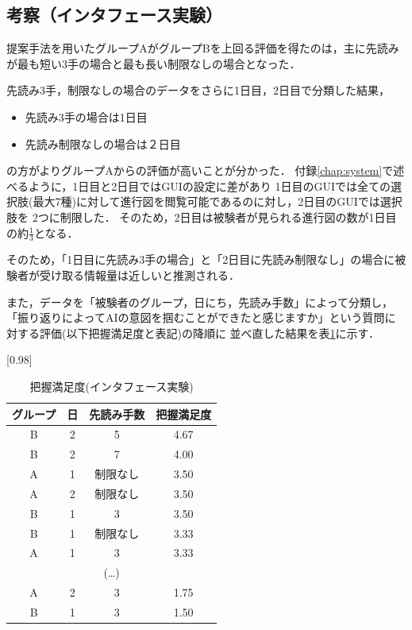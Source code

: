 \subsection{考察（インタフェース実験）}


提案手法を用いたグループAがグループBを上回る評価を得たのは，主に先読みが最も短い3手の場合と最も長い制限なしの場合となった．

先読み3手，制限なしの場合のデータをさらに1日目，2日目で分類した結果，
\begin{itemize}
    \item 先読み3手の場合は1日目
    \item 先読み制限なしの場合は２日目
\end{itemize}

の方がよりグループAからの評価が高いことが分かった．
付録\ref{chap:system}で述べるように，1日目と2日目ではGUIの設定に差があり
1日目のGUIでは全ての選択肢(最大7種)に対して進行図を閲覧可能であるのに対し，2日目のGUIでは選択肢を
2つに制限した．
そのため，2日目は被験者が見られる進行図の数が1日目の約$\frac{1}{3}$となる．

そのため，「1日目に先読み3手の場合」と「2日目に先読み制限なし」の場合に被験者が受け取る情報量は近しいと推測される．

また，データを「被験者のグループ，日にち，先読み手数」によって分類し，「振り返りによってAIの意図を掴むことができたと感じますか」という質問に対する評価(以下把握満足度と表記)の降順に
並べ直した結果を表\ref{table:order}に示す．
\begin{table}[H]
	\caption{把握満足度(インタフェース実験)}
    \label{table:order}
    \scriptsize
	\centering
	\scalebox{0.98}[0.98]{
		\begin{tabular}{c|c|c||c}
			グループ& 日 & 先読み手数 &把握満足度 \\ \hline
			B & 2 & 5 & 4.67\\
            B & 2 & 7 & 4.00\\
            A & 1 & 制限なし& 3.50\\
            A & 2 & 制限なし& 3.50\\
            B & 1 & 3& 3.50\\
            B & 1 & 制限なし& 3.33\\
            A & 1 & 3& 3.33\\
            \multicolumn{4}{c}{(\ldots)}\\
            A & 2 & 3 & 1.75\\
            B & 1 & 3 & 1.50\\

		\end{tabular}
	}
	
\end{table}

